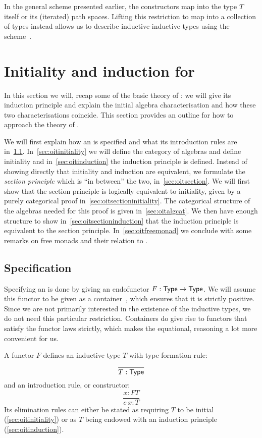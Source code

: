 \documentclass[a4paper,10pt]{report}
\begin{document}
In the general scheme presented earlier, the constructors map into the
type $T$ itself or its (iterated) path spaces. Lifting this
restriction to map into a collection of types instead allows us to
describe inductive-inductive types using the
scheme~\cite{Capriotti2014}.

\chapter{Initiality and induction for \oits}
\label{sec:oits}

In this section we will, recap some of the basic theory of \oits: we
will give its induction principle and explain the initial algebra
characterisation and how these two characterisations coincide. This
section provides an outline for how to approach the theory of \hits.

We will first explain how an \oit is specified and what its
introduction rules are in~\cref{sec:oitspec}.
In~\cref{sec:oitinitiality} we will define the category of algebras
and define initiality and in~\cref{sec:oitinduction} the induction
principle is defined. Instead of showing directly that initiality and
induction are equivalent, we formulate the \emph{section principle}
which is ``in between'' the two, in~\cref{sec:oitsection}. We will
first show that the section principle is logically equivalent to
initiality, given by a purely categorical proof
in~\cref{sec:oitsectioninitiality}. The categorical structure of the
algebras needed for this proof is given in~\cref{sec:oitalgcat}. We
then have enough structure to show in~\cref{sec:oitsectioninduction}
that the induction principle is equivalent to the section
principle. In~\cref{sec:oitfreemonad} we conclude with some remarks on
free monads and their relation to \oits.

\section{Specification}
\label{sec:oitspec}
Specifying an \oit is done by giving an endofunctor
$F : \mathsf{Type} \to \mathsf{Type}$. We will assume this functor to be given as a
container~\cite{Abbott2005}, which ensures that it is strictly
positive. Since we are not primarily interested in the existence of
the inductive types, we do not need this particular
restriction. Containers do give rise to functors that satisfy the
functor laws strictly, which makes the equational, reasoning a lot more
convenient for us.

A functor $F$ defines an inductive type $T$ with type formation rule:
$$
\frac{}{T : \mathsf{Type}}
$$
and an introduction rule, or constructor:
$$
\frac{x : FT}{c\ x : T}
$$
Its elimination rules can either be stated as requiring $T$ to be
initial (\cref{sec:oitinitiality}) or as $T$ being endowed with an
induction principle (\cref{sec:oitinduction}).
\end{document}
